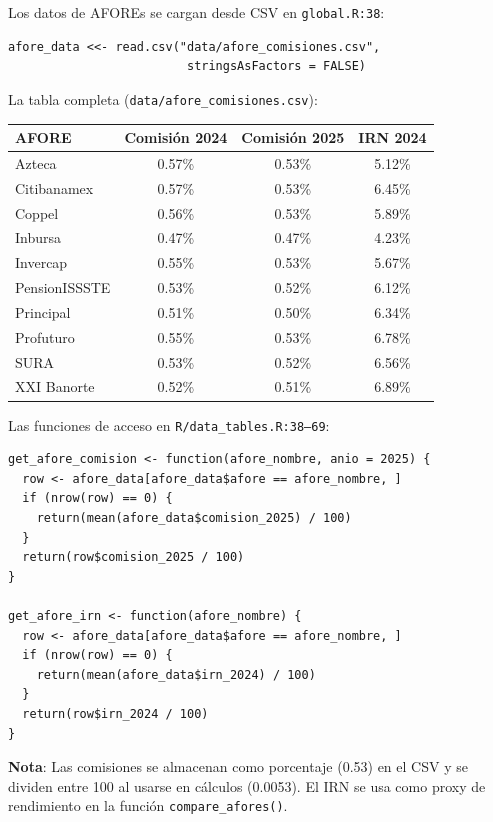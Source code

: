 \documentclass[11pt,a4paper]{report}
\begin{document}
\begin{tcolorbox}[colback=orange!5!white, colframe=orange!75!black, title=\textbf{Aplicaci\'on en C\'odigo}]
Los datos de AFOREs se cargan desde CSV en \texttt{global.R:38}:

\begin{lstlisting}
afore_data <<- read.csv("data/afore_comisiones.csv",
                         stringsAsFactors = FALSE)
\end{lstlisting}

La tabla completa (\texttt{data/afore\_comisiones.csv}):

\begin{center}
\begin{tabular}{lccc}
\toprule
\textbf{AFORE} & \textbf{Comisi\'on 2024} & \textbf{Comisi\'on 2025} & \textbf{IRN 2024} \\
\midrule
Azteca & 0.57\% & 0.53\% & 5.12\% \\
Citibanamex & 0.57\% & 0.53\% & 6.45\% \\
Coppel & 0.56\% & 0.53\% & 5.89\% \\
Inbursa & 0.47\% & 0.47\% & 4.23\% \\
Invercap & 0.55\% & 0.53\% & 5.67\% \\
PensionISSSTE & 0.53\% & 0.52\% & 6.12\% \\
Principal & 0.51\% & 0.50\% & 6.34\% \\
Profuturo & 0.55\% & 0.53\% & 6.78\% \\
SURA & 0.53\% & 0.52\% & 6.56\% \\
XXI Banorte & 0.52\% & 0.51\% & 6.89\% \\
\bottomrule
\end{tabular}
\end{center}

Las funciones de acceso en \texttt{R/data\_tables.R:38--69}:
\begin{lstlisting}
get_afore_comision <- function(afore_nombre, anio = 2025) {
  row <- afore_data[afore_data$afore == afore_nombre, ]
  if (nrow(row) == 0) {
    return(mean(afore_data$comision_2025) / 100)
  }
  return(row$comision_2025 / 100)
}

get_afore_irn <- function(afore_nombre) {
  row <- afore_data[afore_data$afore == afore_nombre, ]
  if (nrow(row) == 0) {
    return(mean(afore_data$irn_2024) / 100)
  }
  return(row$irn_2024 / 100)
}
\end{lstlisting}

\textbf{Nota}: Las comisiones se almacenan como porcentaje (0.53) en el CSV y se dividen entre 100 al usarse en c\'alculos (0.0053). El IRN se usa como proxy de rendimiento en la funci\'on \texttt{compare\_afores()}.
\end{tcolorbox}
\end{document}

